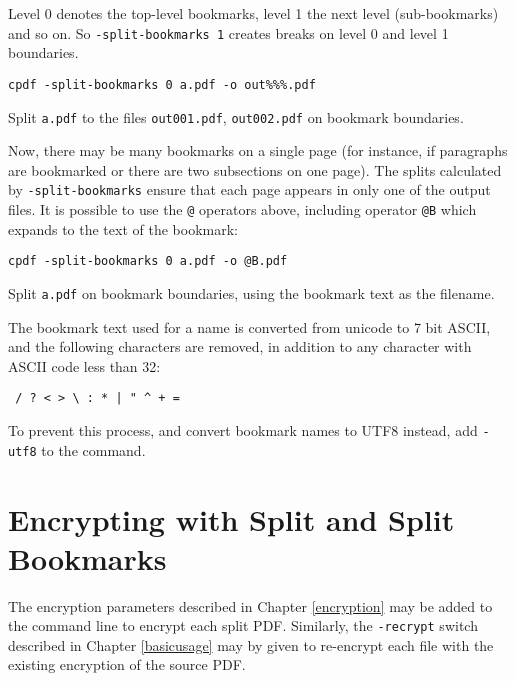 \documentclass{book}
\begin{document}
Level 0 denotes the top-level bookmarks, level 1 the next level (sub-bookmarks)
and so on. So \texttt{-split-bookmarks 1} creates breaks on level 0 and level
1 boundaries.

  \begin{framed}\small
    \verb!cpdf -split-bookmarks 0 a.pdf -o out%%%.pdf!

    \vspace{2.5mm}
    \noindent Split \texttt{a.pdf} to the files \texttt{out001.pdf},
\texttt{out002.pdf} on bookmark boundaries.

  \end{framed}
\noindent Now, there may be many bookmarks on a single page (for instance, if
paragraphs are bookmarked or there are two subsections on one page). The splits
calculated by \texttt{-split-bookmarks} ensure that each page appears in only
one of the output files.
  It is possible to use the \texttt{@} operators above, including operator \texttt{@B} which expands to the text of the bookmark:

  \begin{framed}\small
    \verb!cpdf -split-bookmarks 0 a.pdf -o @B.pdf!

    \vspace{2.5mm}
    \noindent Split \texttt{a.pdf} on bookmark boundaries, using the bookmark text as the filename.

  \end{framed}
\noindent The bookmark text used for a name is converted from unicode to 7 bit ASCII, and the following characters are removed, in addition to any character with ASCII code less than 32:
  \begin{framed}
  \centering
  \verb! / ? < > \ : * | " ^ + =!
  \end{framed}

  To prevent this process, and convert bookmark names to UTF8 instead, add \texttt{-utf8} to the command.

\section{Encrypting with Split and Split Bookmarks}
The encryption parameters described in Chapter \ref{encryption} may be added to the command line to encrypt each split PDF. Similarly, the \texttt{-recrypt} switch described in Chapter \ref{basicusage} may by given to re-encrypt each file with the existing encryption of the source PDF. 
\pagestyle{empty}\thispagestyle{fancy}
\end{document}
